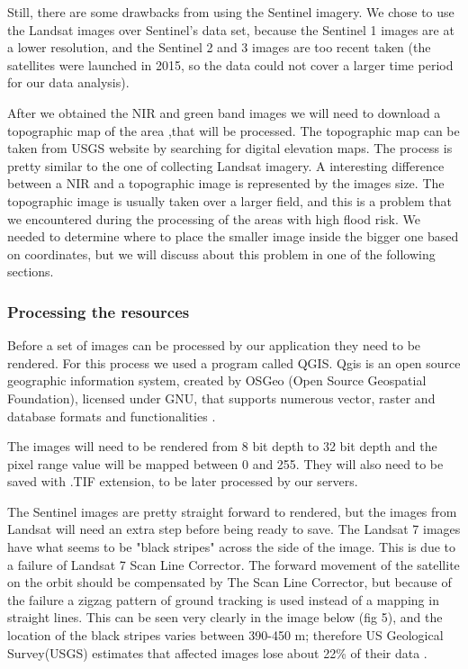 \documentclass[12pt, a4paper]{report}
\begin{document}
Still, there are some drawbacks from using the Sentinel imagery. We chose to use the Landsat images over Sentinel's data set, because the Sentinel 1 images are at a lower resolution, and the Sentinel 2 and 3 images are too recent taken (the satellites were launched in 2015, so the data could not cover a larger time period for our data analysis).
\par 

After we obtained the NIR and green band images we will need to download a topographic map of the area ,that will be processed. The topographic map can be taken from USGS website by searching for digital elevation maps. The process is pretty similar to the one of collecting Landsat imagery. A interesting difference between a NIR and a topographic image is represented by the images size. The topographic image is usually taken over a larger field, and this is a problem that we encountered during the processing of the areas with high flood risk. We needed to determine where to place the smaller image inside the bigger one based on coordinates, but we will discuss about this problem in one of the following sections.
\par

\subsubsection{Processing the resources}

\quad
Before a set of images can be processed by our application they need to be rendered. For this process we used a program called QGIS. Qgis is an open source geographic information system, created by OSGeo (Open Source Geospatial Foundation), licensed under GNU, that supports numerous vector, raster and database formats and functionalities \cite{QGIS}.
\par 

The images will need to be rendered from 8 bit depth to 32 bit depth and the pixel range value will be mapped between 0 and 255. They will also need to be saved with .TIF extension, to be later processed by our servers.
\par 

The Sentinel images are pretty straight forward to rendered, but the images from Landsat will need an extra step before being ready to save. The Landsat 7 images have what seems to be "black stripes" across the side of the image. This is due to a failure of Landsat 7 Scan Line Corrector. The forward movement of the satellite on the orbit should be compensated by The Scan Line Corrector, but because of the failure a zigzag pattern of ground tracking is used instead of a mapping in straight lines. This can be seen very clearly in the image below (fig 5), and the location of the black stripes varies between 390-450 m; therefore US Geological Survey(USGS) estimates that affected images lose about 22\% of their data \cite{Landsat-error}.
\end{document}
